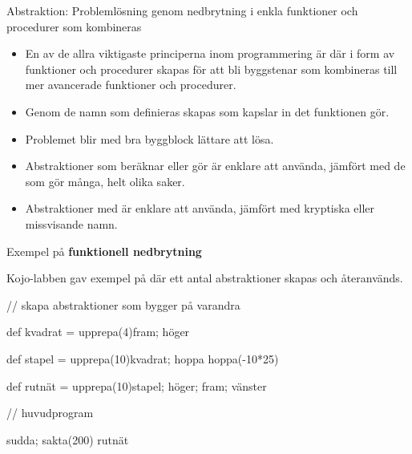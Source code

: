 \begin{Slide}{Abstraktion: Problemlösning genom nedbrytning i enkla funktioner och procedurer som kombineras}\SlideFontSmall
\begin{itemize}
\item En av de allra viktigaste principerna inom programmering är  där   i form av funktioner och procedurer skapas för att bli byggstenar som kombineras till mer avancerade funktioner och procedurer.

\item Genom de namn som definieras skapas  som kapslar in det funktionen gör. 

\item Problemet blir med bra byggblock lättare att lösa.

\item Abstraktioner som beräknar eller gör  är enklare att använda, jämfört med de som gör många, helt olika saker.

\item Abstraktioner med  är enklare att använda, jämfört med kryptiska eller missvisande namn.
\end{itemize}

\end{Slide}



\begin{Slide}{Exempel på \textbf{funktionell nedbrytning}}

Kojo-labben gav exempel på  där ett antal abstraktioner skapas och återanvänds.

\begin{Code}
// skapa abstraktioner som bygger på varandra

def kvadrat = upprepa(4){fram; höger}

def stapel = {
  upprepa(10){kvadrat; hoppa}
  hoppa(-10*25)
}

def rutnät = upprepa(10){stapel; höger; fram; vänster}

// huvudprogram 

sudda; sakta(200)
rutnät
\end{Code}
\end{Slide}


